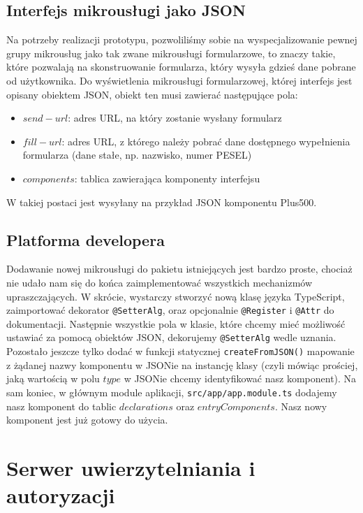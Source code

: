 \documentclass[licencjacka]{pracamgr}
\begin{document}
\subsection{Interfejs mikrousługi jako JSON}
Na potrzeby realizacji prototypu, pozwoliliśmy sobie na wyspecjalizowanie pewnej grupy mikrousług jako tak zwane mikrousługi formularzowe, to znaczy takie, które pozwalają na skonstruowanie formularza, który wysyła gdzieś dane pobrane od użytkownika.
Do wyświetlenia mikrousługi formularzowej, której interfejs jest opisany obiektem JSON, obiekt ten musi zawierać następujące pola:
\begin{itemize}
	\item $send-url$: adres URL, na który zostanie wysłany formularz
	\item $fill-url$: adres URL, z którego należy pobrać dane dostępnego wypełnienia formularza (dane stałe, np. nazwisko, numer PESEL)
	\item $components$: tablica zawierająca komponenty interfejsu
\end{itemize}
W takiej postaci jest wysyłany na przykład JSON komponentu Plus500.

\subsection{Platforma developera}
Dodawanie nowej mikrousługi do pakietu istniejących jest bardzo proste, chociaż nie udało nam się do końca zaimplementować wszystkich mechanizmów upraszczających. 
W skrócie, wystarczy stworzyć nową klasę języka TypeScript, zaimportować dekorator \texttt{@SetterAlg}, oraz opcjonalnie \texttt{@Register} i \texttt{@Attr} do dokumentacji. 
Następnie wszystkie pola w klasie, które chcemy mieć możliwość ustawiać za pomocą obiektów JSON, dekorujemy \texttt{@SetterAlg} wedle uznania. 
Pozostało jeszcze tylko dodać w funkcji statycznej \texttt{createFromJSON()} mapowanie z żądanej nazwy komponentu w JSONie na instancję klasy (czyli mówiąc prościej, jaką wartością w polu $type$ w JSONie chcemy identyfikować nasz komponent). 
Na sam koniec, w głównym module aplikacji, \texttt{src/app/app.module.ts} dodajemy nasz komponent do tablic $declarations$ oraz $entryComponents$. Nasz nowy komponent jest już gotowy do użycia.

\section{Serwer uwierzytelniania i autoryzacji}
\end{document}
